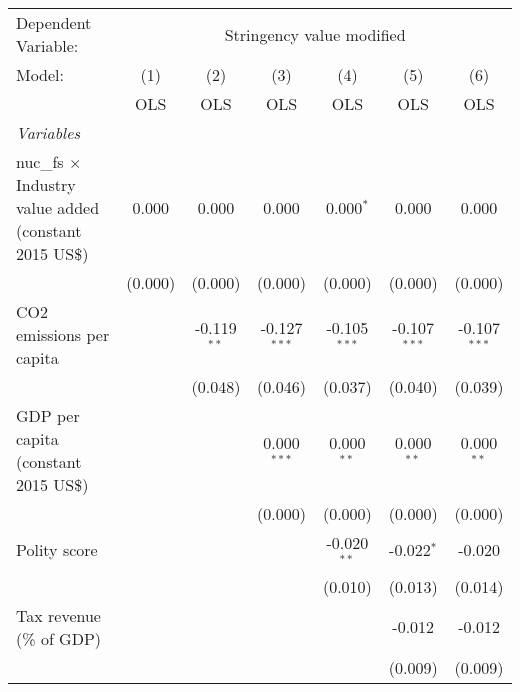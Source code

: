 
\begingroup
\centering
\begin{tabular}{lcccccc}
   \toprule
   Dependent Variable: & \multicolumn{6}{c}{Stringency value modified}\\
   Model:                                                        & (1)     & (2)           & (3)            & (4)            & (5)            & (6)\\  
                                                                 &  OLS    & OLS           & OLS            & OLS            & OLS            & OLS\\  
   \midrule
   \emph{Variables}\\
   nuc\_fs $\times$ Industry value added (constant 2015 US\$)    & 0.000   & 0.000         & 0.000          & 0.000$^{*}$    & 0.000          & 0.000\\   
                                                                 & (0.000) & (0.000)       & (0.000)        & (0.000)        & (0.000)        & (0.000)\\   
   CO2 emissions per capita                                      &         & -0.119$^{**}$ & -0.127$^{***}$ & -0.105$^{***}$ & -0.107$^{***}$ & -0.107$^{***}$\\   
                                                                 &         & (0.048)       & (0.046)        & (0.037)        & (0.040)        & (0.039)\\   
   GDP per capita (constant 2015 US\$)                           &         &               & 0.000$^{***}$  & 0.000$^{**}$   & 0.000$^{**}$   & 0.000$^{**}$\\   
                                                                 &         &               & (0.000)        & (0.000)        & (0.000)        & (0.000)\\   
   Polity score                                                  &         &               &                & -0.020$^{**}$  & -0.022$^{*}$   & -0.020\\   
                                                                 &         &               &                & (0.010)        & (0.013)        & (0.014)\\   
   Tax revenue (\% of GDP)                                       &         &               &                &                & -0.012         & -0.012\\   
                                                                 &         &               &                &                & (0.009)        & (0.009)\\   

\end{tabular}
